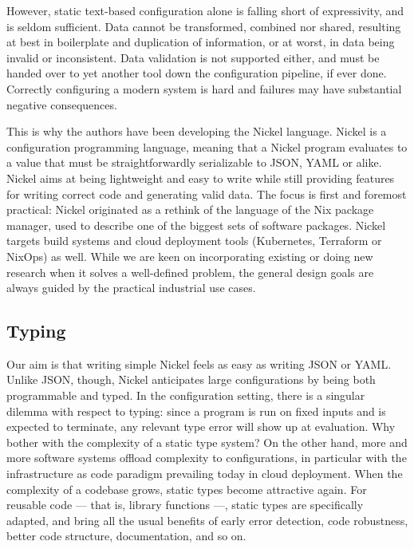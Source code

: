 \documentclass{article}
\begin{document}
However, static text-based configuration alone is falling short of expressivity,
and is seldom sufficient. Data cannot be transformed, combined nor shared,
resulting at best in boilerplate and duplication of information, or at worst, in
data being invalid or inconsistent. Data validation is not supported either, and must be handed over to yet another tool down the configuration pipeline, if ever
done. Correctly configuring a modern system is hard and failures may have
substantial negative consequences.

This is why the authors have been developing the Nickel
language\cite{NickelRepo}. Nickel is a configuration programming language,
meaning that a Nickel program evaluates to a value that must be
straightforwardly serializable to JSON, YAML or alike. Nickel aims at being
lightweight and easy to write while still providing features for writing correct
code and generating valid data. The focus is first and foremost practical:
Nickel originated as a rethink of the language of the Nix package manager, used
to describe one of the biggest sets of software packages\cite{repology}.  Nickel
targets build systems and cloud deployment tools (Kubernetes, Terraform or
NixOps) as well. While we are keen on incorporating existing or doing new
research when it solves a well-defined problem, the general design goals are
always guided by the practical industrial use cases.

\subsection{Typing}

Our aim is that writing simple Nickel feels as easy as writing JSON or YAML.
Unlike JSON, though, Nickel anticipates large configurations by being both
programmable and typed. In the configuration setting, there is a singular
dilemma with respect to typing: since a program is run on fixed inputs and is
expected to terminate, any relevant type error will show up at evaluation.  Why
bother with the complexity of a static type system? On the other hand, more and
more software systems offload complexity to configurations, in particular with
the infrastructure as code paradigm prevailing today in cloud deployment. When
the complexity of a codebase grows, static types become attractive again.  For
reusable code — that is, library functions —, static types are specifically
adapted, and bring all the usual benefits of early error detection, code
robustness, better code structure, documentation, and so on.
\end{document}
